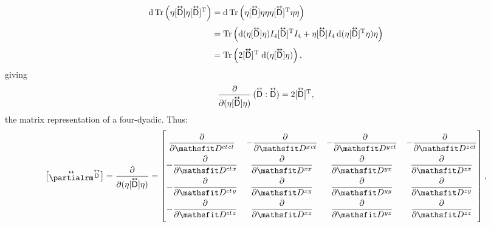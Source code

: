 \documentclass[12pt]{article}
\newcommand{\dd}[1]{\mathrm{d}#1}
\newcommand{\superoverset}[2]{%
  \mathop{#2}\limits^{\vbox to -.5ex{\kern-0.95ex\hbox{$#1$}\vss}}}
\newcommand{\superdy}[1]{\superoverset{\text{\tiny$\bm\leftrightarrow$}}{#1}}
\newcommand{\capdy}[1]{ \overset{ \text{\tiny$\bm\leftrightarrow$} }{\vphantom{\text{\small{A}}}\smash{#1}} }
\begin{document}
\begin{equation*}
\begin{aligned}
\dd \, \mathrm{Tr} \left( \eta [\capdy{\mathsf{D}}] \eta [ \capdy{\mathsf{D}} ]^{\mathrm{T}} \right) &= \dd \, \mathrm{Tr} \left( \eta [\capdy{\mathsf{D}}] \eta \eta \eta [ \capdy{\mathsf{D}} ]^{\mathrm{T}} \eta \eta \right) \\[3pt]
&= \mathrm{Tr} \left( \dd (\eta [\capdy{\mathsf{D}}] \eta ) I_4 [ \capdy{\mathsf{D}} ]^{\mathrm{T}} I_4 +  \eta [\capdy{\mathsf{D}}] I_4 \, \dd ( \eta [\capdy{\mathsf{D}}]^\mathrm{T} \eta ) \eta \right) \\[3pt]
&= \mathrm{Tr} \left( 2 [\capdy{\mathsf{D}}]^\mathrm{T} \; \dd (\eta [\capdy{\mathsf{D}}] \eta ) \right) ,
\end{aligned}
\end{equation*}
giving
\begin{equation*}
\dfrac{\partial}{\partial (\eta [ \capdy{\mathsf{D}} ] \eta)} \, ( \capdy{\mathsf{D}} : \capdy{\mathsf{D}} ) = 2 [\capdy{\mathsf{D}}]^\mathrm{T} ,
\end{equation*}
the matrix representation of a four-dyadic. Thus:
\begin{equation*}
\begin{bmatrix}
\capdy{\partialrm} {}^{\superdy{\mathsf{D}}} \\[-.375ex]
\end{bmatrix}
=
\dfrac{\partial}{\partial (\eta [ \capdy{\mathsf{D}} ] \eta)}
=
\begin{bmatrix}
\\[-2ex]
\dfrac{\partial}{\partial \mathsfit D^{ct \mkern1.5mu ct}} & -\dfrac{\partial}{\partial \mathsfit D^{x \mkern1.5mu ct}} & -\dfrac{\partial}{\partial \mathsfit D^{y \mkern1.5mu ct}} & -\dfrac{\partial}{\partial \mathsfit D^{z \mkern1.5mu ct}} \\[2ex]
-\dfrac{\partial}{\partial \mathsfit D^{ct \mkern1.5mu x}} & \dfrac{\partial}{\partial \mathsfit D^{x x}} & \dfrac{\partial}{\partial \mathsfit D^{y x}} & \dfrac{\partial}{\partial \mathsfit D^{z x}}  \\[2ex]
-\dfrac{\partial}{\partial \mathsfit D^{ct \mkern1.5mu y}} & \dfrac{\partial}{\partial \mathsfit D^{x y}} & \dfrac{\partial}{\partial \mathsfit D^{y y}} & \dfrac{\partial}{\partial \mathsfit D^{z y}}  \\[2ex]
-\dfrac{\partial}{\partial \mathsfit D^{ct \mkern1.5mu z}} & \dfrac{\partial}{\partial \mathsfit D^{x z}} & \dfrac{\partial}{\partial \mathsfit D^{y z}} & \dfrac{\partial}{\partial \mathsfit D^{z z}} \\[2ex]
\end{bmatrix} ,
\end{equation*}
\end{document}
